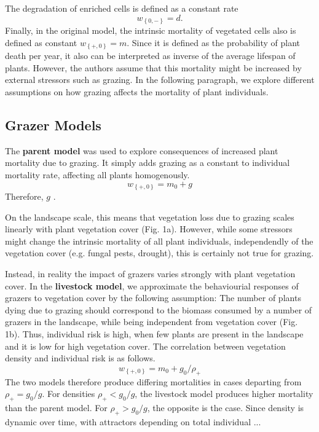 The degradation of enriched cells is defined as a constant rate	
\begin{equation}
w_{ \left\{0,- \right\} } = d.
\label{eq:}
\end{equation}
Finally, in the original model, the intrinsic mortality of vegetated cells also is defined as constant $w_{ \left\{+,0 \right\} } = m$. Since it is defined as the probability of plant death per year, it also can be interpreted as inverse of the average lifespan of plants. However, the authors assume that this mortality might be increased by external stressors such as grazing. In the following paragraph, we explore different assumptions on how grazing affects the mortality of plant individuals.

\subsection{Grazer Models}
The \textbf{parent model} was used to explore consequences of increased plant mortality due to grazing. It simply adds grazing as a constant to individual mortality rate, affecting all plants homogenously.
\begin{equation}
	w_{ \left\{ +,0 \right\} }  = m_0 + g
\end{equation}
Therefore, $g$ . 

On the landscape scale, this means that vegetation loss due to grazing scales linearly with plant vegetation cover (Fig. 1a). However, while some stressors might change the intrinsic mortality of all plant individuals, independendly of the vegetation cover (e.g. fungal pests, drought), this is certainly not true for grazing.

Instead, in reality the impact of grazers varies strongly with plant vegetation cover. In the \textbf{livestock model}, we approximate the behaviourial responses of grazers to vegetation cover by the following assumption: The number of plants dying due to grazing should correspond to the biomass consumed by a number of grazers in the landscape, while being independent from vegetation cover  (Fig. 1b). Thus, individual risk is high, when few plants are present in the landscape and it is low for high vegetation cover. The correlation between vegetation density and individual risk is as follows. 
\begin{equation}
	w_{ \left\{ +,0 \right\} }  = m_0 + g_0 / \rho_+
\end{equation}
The two models therefore produce differing mortalities in cases departing from  $ \rho_+ = g_0 / g$. For densities $ \rho_+ < g_0 / g$, the livestock model produces higher mortality than the parent model. For $ \rho_+ > g_0 / g$, the opposite is the case. Since density is dynamic over time, with attractors depending on total individual ... 


